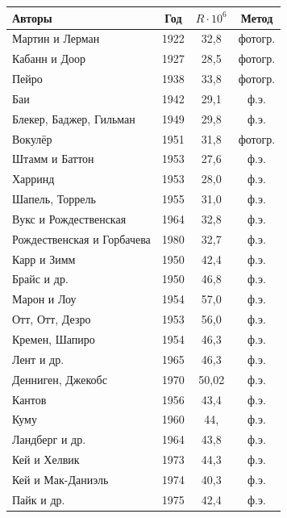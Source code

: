 \vskip 0mm
\begin{figure}[tbp]

{\small
{}
\begin{center}
 \begin{tabular}{| l | c | c | c |}
    \hline
    Авторы & Год & $R\cdot10^6$ & Метод \\ \hline
    Мартин и Лерман & 1922 & 32,8 & фотогр. \\ \hline
    Кабанн и Доор & 1927 & 28,5 & фотогр. \\ \hline
    Пейро & 1938 & 33,8 & фотогр. \\ \hline
    Баи & 1942 & 29,1 & ф.э. \\ \hline
    Блекер, Баджер, Гильман & 1949 & 29,8 & ф.э. \\ \hline
    Вокулёр & 1951 & 31,8 & фотогр. \\ \hline
    Штамм и Баттон & 1953 & 27,6 & ф.э. \\ \hline
    Харринд & 1953 & 28,0 & ф.э. \\ \hline
    Шапель, Торрель & 1955 & 31,0 & ф.э. \\ \hline
    Вукс и Рождественская & 1964 & 32,8 & ф.э. \\ \hline
    Рождественская и Горбачева& 1980 & 32,7 & ф.э. \\ \hline\hline
    Карр и Зимм & 1950 & 42,4 & ф.э. \\ \hline
    Брайс и др. & 1950 & 46,8 & ф.э. \\ \hline
    Марон и Лоу & 1954 & 57,0 & ф.э. \\ \hline
    Отт, Отт, Дезро & 1953 & 56,0 & ф.э. \\ \hline
    Кремен, Шапиро & 1954 & 46,3 & ф.э. \\ \hline
    Лент и др. & 1965 & 46,3 & ф.э. \\ \hline
    Денниген, Джекобс & 1970 & 50,02 & ф.э. \\ \hline\hline
    Кантов & 1956 & 43,4 & ф.э. \\ \hline
    Куму & 1960 & 44, & ф.э. \\ \hline
    Ландберг и др. & 1964 & 43,8 & ф.э. \\ \hline
    Кей и Хелвик & 1973 & 44,3 & ф.э. \\ \hline
    Кей и Мак-Даниэль & 1974 & 40,3 & ф.э. \\ \hline
    Пайк и др. & 1975 & 42,4 & ф.э. \\ \hline
  \end{tabular}
\end{center}
}
\end{figure}

